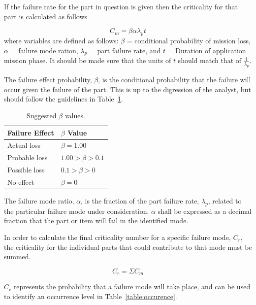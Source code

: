 \documentclass[paper=letter, fontsize=11pt]{scrartcl} %
\numberwithin{equation}{section} %
\numberwithin{figure}{section} %
\numberwithin{table}{section} %
\begin{document}
If the failure rate for the part in question is given then the criticality for that part is calculated as follows

\begin{equation*}
C_m = \beta \alpha \lambda_p t
\end{equation*}
where variables are defined as follows: $\beta$ = conditional probability of mission loss, $\alpha$ = failure mode ration, $\lambda_p$ = part failure rate, and $t$ = Duration of application mission phase. It should be made sure that the units of $t$ should match that of $\frac{1}{\lambda_p}$.

The failure effect probability, $\beta$, is the conditional probability that the failure will occur given the failure of the part. This is up to the digression of the analyst, but should follow the guidelines in Table~\ref{table:beta}.

\begin{table}[H]
\begin{centering}
\begin{tabular}{l l}
	\toprule
	Failure Effect & $\beta$ Value \\
	\midrule
	Actual loss    & $\beta = 1.00$ \\
	Probable loss  & $1.00 > \beta > 0.1$ \\
	Possible loss  & $0.1 > \beta > 0$ \\
	No effect      & $\beta = 0$ \\
	\bottomrule
\end{tabular}
\caption{Suggested $\beta$ values.}
\label{table:beta}
\end{centering}
\end{table}

The failure mode ratio, $\alpha$, is the fraction of the part failure rate, $\lambda_p$, related to the particular failure mode under consideration. $\alpha$ shall be expressed as a decimal fraction that the part or item will fail in the identified mode.

In order to calculate the final criticality number for a specific failure mode, $C_r$, the criticality for the individual parts that could contribute to that mode must be summed.

\begin{equation*}
C_r = \Sigma C_m
\end{equation*}

$C_r$ represents the probability that a failure mode will take place, and can be used to identify an occurrence level in Table~\ref{table:occurence}.
\end{document}
